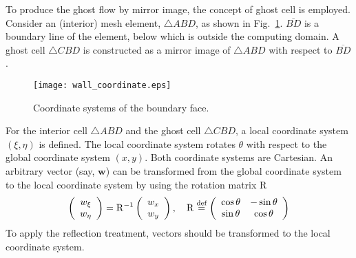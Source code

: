 \documentclass[a4paper,12pt,dvips]{article}
\newcommand*\defeq{\buildrel{\text{def}}\over{=}}
\begin{document}
To produce the ghost flow by mirror image, the concept of ghost cell is
employed.  Consider an (interior) mesh element, $\bigtriangleup ABD$, as shown
in Fig.~\ref{f:wall_coordinate}.  $\overline{BD}$ is a boundary line of the
element, below which is outside the computing domain.  A ghost cell
$\bigtriangleup CBD$ is constructed as a mirror image of $\bigtriangleup ABD$
with respect to $\overline{BD}$.

\begin{figure}[htbp]
\centering
\texttt{[image: wall\_coordinate.eps]}
\caption{Coordinate systems of the boundary face.}
\label{f:wall_coordinate}
\end{figure}

For the interior cell $\bigtriangleup ABD$ and the ghost cell $\bigtriangleup
CBD$, a local coordinate system $(\xi, \eta)$ is defined.  The local coordinate
system rotates $\theta$ with respect to the global coordinate system $(x, y)$.
Both coordinate systems are Cartesian.  An arbitrary vector (say, $\mathbf{w}$)
can be transformed from the global coordinate system to the local coordinate
system by using the rotation matrix $\mathrm{R}$
\begin{align*}
\left(\begin{array}{c} w_{\xi} \\ w_{\eta} \end{array}\right)
= \mathrm{R}^{-1}
\left(\begin{array}{c} w_x \\ w_y \end{array}\right), \quad
\mathrm{R} \defeq \left(\begin{array}{cc}
  \cos\theta & -\sin\theta \\ \sin\theta & \cos\theta
\end{array}\right)
\end{align*}
To apply the reflection treatment, vectors should be transformed to the local
coordinate system.
\end{document}
